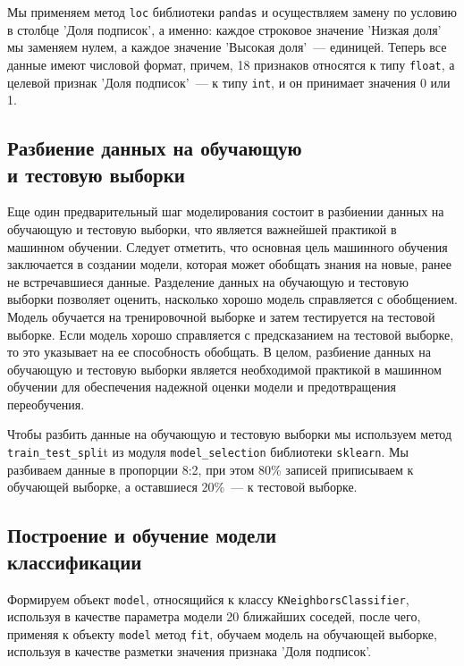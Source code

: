 Мы применяем метод \texttt{loc} библиотеки \texttt{pandas} и осуществляем  замену по условию в столбце 'Доля подписок', а именно: каждое строковое значение 'Низкая доля' мы заменяем нулем, а каждое значение 'Высокая доля'~--- единицей. Теперь все данные имеют числовой формат, причем, 18 признаков относятся к типу \texttt{float}, а  целевой признак 'Доля подписок'~--- к типу \texttt{int}, и он принимает значения 0 или 1.

\subsection{Разбиение данных на обучающую\\ и тестовую выборки}

Еще один предварительный шаг моделирования состоит в разбиении данных на обучающую и тестовую выборки, что является важнейшей практикой в машинном обучении. 
Следует отметить, что основная цель машинного обучения заключается в создании модели, которая может обобщать знания на новые, ранее не встречавшиеся данные. Разделение данных на обучающую и тестовую выборки позволяет оценить, насколько хорошо модель справляется с обобщением. Модель обучается на тренировочной выборке и затем тестируется на тестовой выборке. Если модель хорошо справляется с предсказанием на тестовой выборке, то это указывает на ее способность обобщать. В целом, разбиение данных на обучающую и тестовую выборки является необходимой практикой в машинном обучении для обеспечения надежной оценки модели и предотвращения переобучения.

Чтобы разбить данные на обучающую и тестовую выборки мы используем метод \texttt{train\_test\_spli}t из модуля \texttt{model\_selection} библиотеки \texttt{sklearn}. Мы разбиваем данные в пропорции 8:2, при этом 80\% записей приписываем к обучающей выборке, а оставшиеся 20\%~--- к тестовой выборке.

\subsection{Построение и обучение модели\\ классификации}

Формируем объект \texttt{model}, относящийся к классу \texttt{KNeighborsClassifier}, используя в качестве параметра модели 20 ближайших соседей, после чего, применяя к объекту \texttt{model} метод \texttt{fit}, обучаем модель на обучающей выборке, используя в качестве разметки значения признака 'Доля подписок'.


